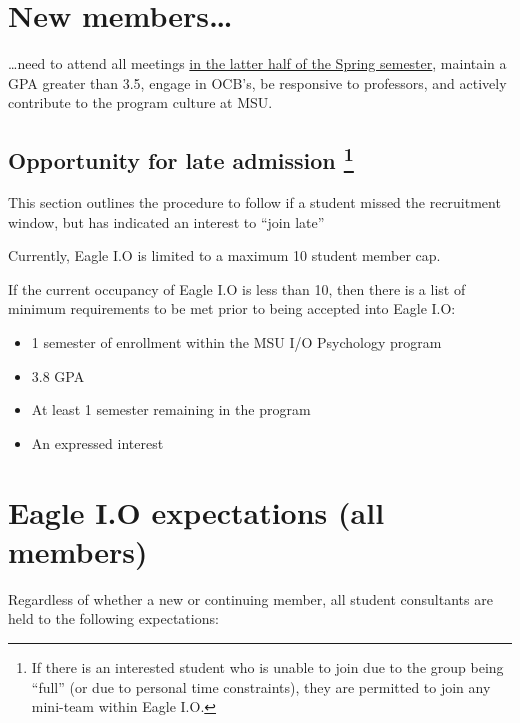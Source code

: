 \documentclass[
]{book}
\providecommand{\tightlist}{%
  \setlength{\itemsep}{0pt}\setlength{\parskip}{0pt}}
\begin{document}
\hypertarget{new-members}{%
\section{New members\ldots{}}\label{new-members}}

\ldots need to attend all meetings \protect\hyperlink{timetable}{in the latter half of the Spring semester}, maintain a GPA greater than 3.5, engage in OCB's, be responsive to professors, and actively contribute to the program culture at MSU.

\hypertarget{late}{%
\subsection[Opportunity for late admission ]{\texorpdfstring{Opportunity for late admission \footnote{If there is an interested student who is unable to join due to the group being ``full'' (or due to personal time constraints), they are permitted to join any mini-team within Eagle I.O.}}{Opportunity for late admission }}\label{late}}

This section outlines the procedure to follow if a student missed the recruitment window, but has indicated an interest to ``join late''

Currently, Eagle I.O is limited to a maximum 10 student member cap.

If the current occupancy of Eagle I.O is less than 10, then there is a list of minimum requirements to be met prior to being accepted into Eagle I.O:

\begin{itemize}
\tightlist
\item
  1 semester of enrollment within the MSU I/O Psychology program
\item
  3.8 GPA
\item
  At least 1 semester remaining in the program
\item
  An expressed interest
\end{itemize}

\hypertarget{eagle-i.o-expectations-all-members}{%
\section{Eagle I.O expectations (all members)}\label{eagle-i.o-expectations-all-members}}

Regardless of whether a new or continuing member, all student consultants are held to the following expectations:
\end{document}
